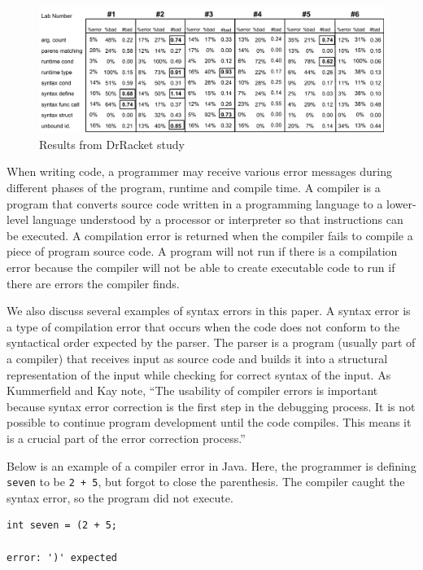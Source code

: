 \documentclass{sig-alternate}
\begin{document}
\begin{figure}
  \centering
  \includegraphics[keepaspectratio, width= 1.0 \textwidth]{MEE-Data.pdf}
  \caption{Results from DrRacket study}
  \label{fig:drracketdata}
\end{figure}

When writing code, a programmer may receive various error messages during different phases of the program, runtime and compile time.
A compiler is a program that converts source code written in a programming language to a lower-level language understood by a processor or interpreter so that instructions can be executed.
A compilation error is returned when the compiler fails to compile a piece of program source code.
A program will not run if there is a compilation error because the compiler will not be able to create executable code to run if there are errors the compiler finds. 

We also discuss several examples of syntax errors in this paper.
A syntax error is a type of compilation error that occurs when the code does not conform to the syntactical order expected by the parser.
The parser is a program (usually part of a compiler) that receives input as source code and builds it into a structural representation of the input while checking for correct syntax of the input.
As Kummerfield and Kay note, ``The usability of compiler errors is important because syntax error correction is the first step in the debugging process. It is not possible to continue program development until the code compiles. This means it is a crucial part of the error correction process.''~\cite{Kummerfeld:2003:NBF:858403.858416}

Below is an example of a compiler error in Java. Here, the programmer is defining \texttt{seven} to be \texttt{2 + 5}, but forgot to close the parenthesis. The compiler caught the syntax error, so the program did not execute.

\begin{verbatim}
int seven = (2 + 5;

error: ')' expected
\end{verbatim}
\end{document}
